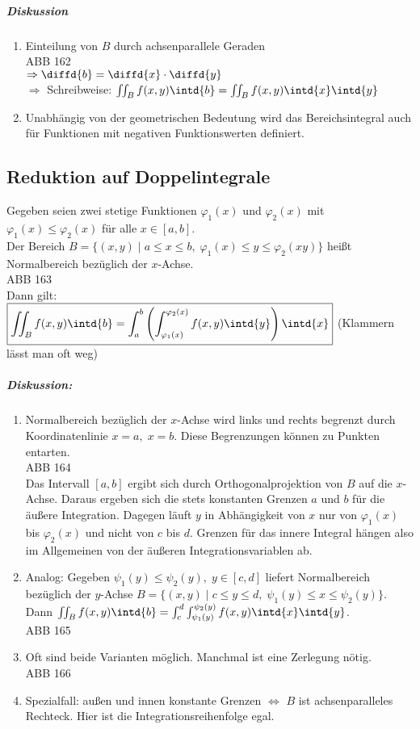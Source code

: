 \subparagraph{Diskussion}
\begin{enumerate}
\item Einteilung von $B$ durch achsenparallele Geraden\\
ABB 162\\
$\Rightarrow \diffd{b}=\diffd{x}\cdot \diffd{y}$\\
$\Rightarrow$ Schreibweise: $\iint_B f(x,y)\intd{b}=\iint_B f(x,y)\intd{x}\intd{y}$
\item Unabhängig von der geometrischen Bedeutung wird das Bereichsintegral auch für Funktionen mit negativen Funktionswerten definiert.
\end{enumerate}

\subsection{Reduktion auf Doppelintegrale}
Gegeben seien zwei stetige Funktionen $\varphi_1(x)$ und $\varphi_2(x)$ mit $\varphi_1(x) \leq \varphi_2(x)$ für alle $ x \in [a,b]$.\\
Der Bereich $B=\{(x,y)\;|\; a\leq x \leq b, \; \varphi_1(x)\leq y \leq \varphi_2(xy)\}$ heißt Normalbereich bezüglich der $x$-Achse.\\
ABB 163\\
Dann gilt:\\
$\boxed{\iint_B f(x,y) \intd{b}=\int_a^b\left( \int_{\varphi_1(x)}^{\varphi_2(x)} f(x,y) \intd{y}\right) \intd{x}}$ (Klammern lässt man oft weg)

\subparagraph{Diskussion:}
\begin{enumerate}
\item Normalbereich bezüglich der $x$-Achse wird links und rechts begrenzt durch Koordinatenlinie $x=a, \; x=b$. Diese Begrenzungen können zu Punkten entarten.\\
ABB 164\\
Das Intervall $[a,b]$ ergibt sich durch Orthogonalprojektion von $B$ auf die $x$-Achse. Daraus ergeben sich die stets konstanten Grenzen $a$ und $b$ für die äußere Integration. Dagegen läuft $y$ in Abhängigkeit von $x$ nur von $\varphi_1(x)$ bis $\varphi_2(x)$ und nicht von $c$ bis $d$. Grenzen für das innere Integral hängen also im Allgemeinen von der äußeren Integrationsvariablen ab.
\item Analog: Gegeben $\psi_1(y)\leq \psi_2(y), \; y\in [c,d]$ liefert Normalbereich bezüglich der $y$-Achse $B=\{(x,y)\;|\; c\leq y \leq d, \; \psi_1(y) \leq x  \leq \psi_2(y)\}$.\\
Dann $\iint_B f(x,y)\intd{b}=\int_c^d\int_{\psi_1(y)}^{\psi_2(y)} f(x,y) \intd{x}\intd{y}$.\\
ABB 165
\item Oft sind beide Varianten möglich. Manchmal ist eine Zerlegung nötig.\\
ABB 166
\item Spezialfall: außen und innen konstante Grenzen $\Leftrightarrow$ $B$ ist achsenparalleles Rechteck. Hier ist die Integrationsreihenfolge egal. 
\end{enumerate}


